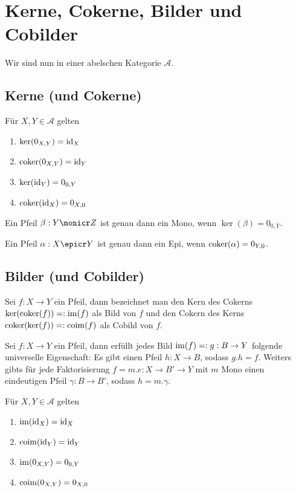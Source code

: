 \section{Kerne, Cokerne, Bilder und Cobilder}

Wir sind nun in einer abelschen Kategorie $\mathcal A$.

\subsection{Kerne (und Cokerne)}


\begin{prop}
Für $X,Y \in \mathcal A$ gelten
\begin{enumerate}
\item $\ker(0_{X,Y}) = \operatorname{id}_X$
\item $\operatorname{coker}(0_{X,Y}) = \operatorname{id}_Y$
\item $\ker(\operatorname{id}_Y) = 0_{0,Y}$
\item $\operatorname{coker}(\operatorname{id}_X) = 0_{X,0}$
\end{enumerate}
\end{prop}

\begin{prop}
Ein Pfeil $\beta : Y \monicr Z$ ist genau dann ein Mono, wenn $\ker(\beta) = 0_{0,Y}$.

Ein Pfeil $\alpha : X \epicr Y$ ist genau dann ein Epi, wenn $\operatorname{coker}(\alpha) = 0_{Y,0}$.
\end{prop}

\subsection{Bilder (und Cobilder)}

\begin{defn}
Sei $f : X\to Y$ ein Pfeil, dann bezeichnet man den Kern des Cokerns $\ker(\operatorname{coker}(f)) =: \operatorname{im}(f)$ als Bild von $f$
und den Cokern des Kerns $\operatorname{coker}(\ker(f)) =: \operatorname{coim}(f)$ als Cobild von $f$.
\end{defn}

\begin{prop}
Sei $f:X\to Y$ ein Pfeil, dann erfüllt jedes Bild $\operatorname{im}(f) =: g : B \to Y$ folgende universelle Eigenschaft:
Es gibt einen Pfeil $h : X \to B$, sodass $g.h = f$. Weiters gibts für jede Faktorisierung $f = m . e : X \to B' \to Y$ mit $m$ Mono einen eindeutigen Pfeil $\gamma : B \to B'$, sodass $h = m.\gamma$.
\end{prop}

\begin{prop}
Für $X,Y \in \mathcal A$ gelten
\begin{enumerate}
\item $\operatorname{im}(\operatorname{id}_X) = \operatorname{id}_X$
\item $\operatorname{coim}(\operatorname{id}_Y) = \operatorname{id}_Y$
\item $\operatorname{im}(0_{X,Y}) = 0_{0,Y}$
\item $\operatorname{coim}(0_{X,Y}) = 0_{X,0}$
\end{enumerate}
\end{prop}



